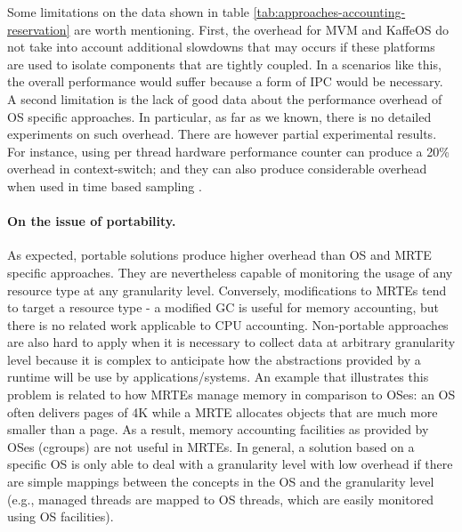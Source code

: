 Some limitations on the data shown in table \ref{tab:approaches-accounting-reservation} are worth mentioning.
First, the overhead for MVM and KaffeOS do not take into account additional slowdowns that may occurs if these platforms are used to isolate components that are tightly coupled. 
In a scenarios like this, the overall performance would suffer because a form of IPC would be necessary.
A second limitation is the lack of good data about the performance overhead of OS specific approaches.
In particular, as far as we known, there is no detailed experiments on such overhead.
There are however partial experimental results.
For instance, using per thread hardware performance counter can produce a 20\% overhead in context-switch\cite{Weaver2013}; and they can also produce considerable overhead when used in time based sampling \cite{Weaver2015}.

\paragraph{On the issue of portability.}
As expected, portable solutions produce higher overhead than OS and MRTE specific approaches.
They are nevertheless capable of monitoring the usage of any resource type at any granularity level.
Conversely, modifications to MRTEs tend to target a resource type - a modified GC is useful for memory accounting, but there is no related work applicable to CPU accounting.
Non-portable approaches are also hard to apply when it is necessary to collect data at arbitrary granularity level because it is complex to anticipate how the abstractions provided by a runtime will be use by applications/systems. 
An example that illustrates this problem is related to how MRTEs manage memory in comparison to OSes: an OS often delivers pages of 4K while a MRTE allocates objects that are much more smaller than a page.
As a result, memory accounting facilities as provided by OSes (cgroups) are not useful in MRTEs. 
In general, a solution based on a specific OS is only able to deal with a granularity level with low overhead if there are simple mappings between the concepts in the OS and the granularity level (e.g., managed threads are mapped to OS threads, which are easily monitored using OS facilities). 

